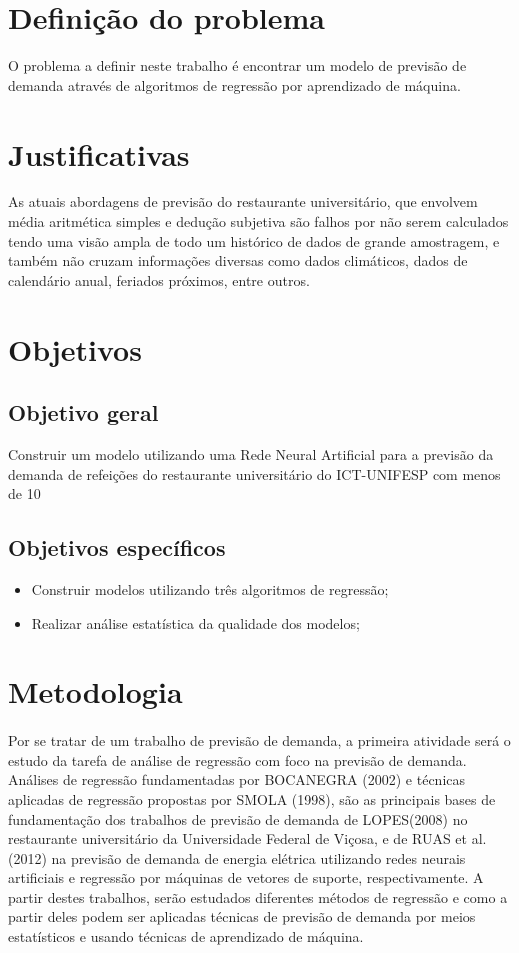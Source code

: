 \documentclass[	12pt, Times, openright, twoside, a4paper, english, brazil]{abntex2}
\begin{document}
\section{Definição do problema}
O problema a definir neste trabalho é encontrar um modelo de previsão de demanda através de algoritmos de regressão por aprendizado de máquina.

\section{Justificativas}
As atuais abordagens de previsão do restaurante universitário, que envolvem média aritmética simples e dedução subjetiva são falhos por não serem calculados tendo uma visão ampla de todo um histórico de dados de grande amostragem, e também não cruzam informações diversas como dados climáticos, dados de calendário anual, feriados próximos, entre outros.

\section{Objetivos}
\subsection{Objetivo geral}
Construir um modelo utilizando uma Rede Neural Artificial para a previsão da demanda de
refeições do restaurante universitário do ICT-UNIFESP com menos de 10%
\subsection{Objetivos específicos}
\begin{itemize}
\item Construir modelos utilizando três algoritmos de regressão; 
\item Realizar análise estatística da qualidade dos modelos;
\end{itemize}

\section{Metodologia}
\paragraph*{} Por se tratar de um trabalho de previsão de demanda, a primeira atividade será o estudo da tarefa de análise de regressão com foco na previsão de demanda. Análises de regressão fundamentadas por BOCANEGRA (2002) e técnicas aplicadas de regressão propostas por SMOLA (1998), são as principais bases de fundamentação dos trabalhos de previsão de demanda de LOPES(2008) no restaurante universitário da Universidade Federal de Viçosa, e de RUAS et al. (2012) na previsão de demanda de energia elétrica utilizando redes neurais artificiais e regressão por máquinas de vetores de suporte, respectivamente. A partir destes trabalhos, serão estudados diferentes métodos de regressão e como a partir deles podem ser aplicadas técnicas de previsão de demanda por meios estatísticos e usando técnicas de aprendizado de máquina.
\end{document}
